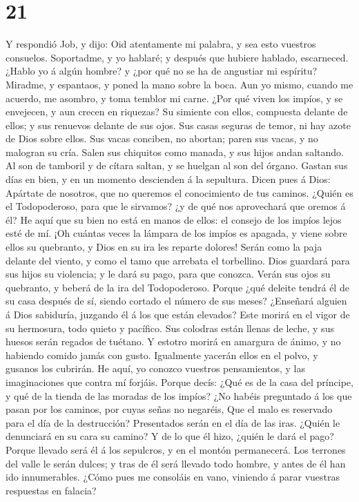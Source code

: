 \hypertarget{section-20}{%
\section{21}\label{section-20}}

 Y respondió Job, y dijo:  Oid atentamente mi
palabra, y sea esto vuestros consuelos.  Soportadme, y yo
hablaré; y después que hubiere hablado, escarneced.  ¿Hablo
yo á algún hombre? y ¿por qué no se ha de angustiar mi espíritu?
 Miradme, y espantaos, y poned la mano sobre la boca.
 Aun yo mismo, cuando me acuerdo, me asombro, y toma temblor
mi carne.  ¿Por qué viven los impíos, y se envejecen, y aun
crecen en riquezas?  Su simiente con ellos, compuesta
delante de ellos; y sus renuevos delante de sus ojos.  Sus
casas seguras de temor, ni hay azote de Dios sobre ellos. 
Sus vacas conciben, no abortan; paren sus vacas, y no malogran su cría.
 Salen sus chiquitos como manada, y sus hijos andan
saltando.  Al son de tamboril y de cítara saltan, y se
huelgan al son del órgano.  Gastan sus días en bien, y en
un momento descienden á la sepultura.  Dicen pues á Dios:
Apártate de nosotros, que no queremos el conocimiento de tus caminos.
 ¿Quién es el Todopoderoso, para que le sirvamos? ¿y de qué
nos aprovechará que oremos á él?  He aquí que su bien no
está en manos de ellos: el consejo de los impíos lejos esté de mí.
 ¡Oh cuántas veces la lámpara de los impíos es apagada, y
viene sobre ellos su quebranto, y Dios en su ira les reparte dolores!
 Serán como la paja delante del viento, y como el tamo que
arrebata el torbellino.  Dios guardará para sus hijos su
violencia; y le dará su pago, para que conozca.  Verán sus
ojos su quebranto, y beberá de la ira del Todopoderoso. 
Porque ¿qué deleite tendrá él de su casa después de sí, siendo cortado
el número de sus meses?  ¿Enseñará alguien á Dios
sabiduría, juzgando él á los que están elevados?  Este
morirá en el vigor de su hermosura, todo quieto y pacífico.
 Sus colodras están llenas de leche, y sus huesos serán
regados de tuétano.  Y estotro morirá en amargura de ánimo,
y no habiendo comido jamás con gusto.  Igualmente yacerán
ellos en el polvo, y gusanos los cubrirán.  He aquí, yo
conozco vuestros pensamientos, y las imaginaciones que contra mí
forjáis.  Porque decís: ¿Qué es de la casa del príncipe, y
qué de la tienda de las moradas de los impíos?  ¿No habéis
preguntado á los que pasan por los caminos, por cuyas señas no negaréis,
 Que el malo es reservado para el día de la destrucción?
Presentados serán en el día de las iras.  ¿Quién le
denunciará en su cara su camino? Y de lo que él hizo, ¿quién le dará el
pago?  Porque llevado será él á los sepulcros, y en el
montón permanecerá.  Los terrones del valle le serán
dulces; y tras de él será llevado todo hombre, y antes de él han ido
innumerables.  ¿Cómo pues me consoláis en vano, viniendo á
parar vuestras respuestas en falacia?

